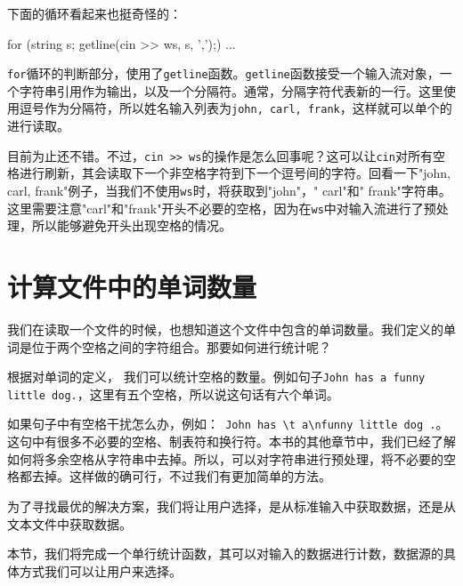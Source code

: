 下面的循环看起来也挺奇怪的：

\begin{codebox}[cpp]
for (string s; getline(cin >> ws, s, ',');) { ... }
\end{codebox}

\texttt{for}循环的判断部分，使用了\texttt{getline}函数。\texttt{getline}函数接受一个输入流对象，一个字符串引用作为输出，以及一个分隔符。通常，分隔字符代表新的一行。这里使用逗号作为分隔符，所以姓名输入列表为\texttt{john, carl, frank}，这样就可以单个的进行读取。

目前为止还不错。不过，\texttt{cin >> ws}的操作是怎么回事呢？这可以让\texttt{cin}对所有空格进行刷新，其会读取下一个非空格字符到下一个逗号间的字符。回看一下"john, carl, frank"例子，当我们不使用\texttt{ws}时，将获取到"john"，" carl"和" frank"字符串。这里需要注意"carl"和"frank"开头不必要的空格，因为在\texttt{ws}中对输入流进行了预处理，所以能够避免开头出现空格的情况。


\section{计算文件中的单词数量}

我们在读取一个文件的时候，也想知道这个文件中包含的单词数量。我们定义的单词是位于两个空格之间的字符组合。那要如何进行统计呢？

根据对单词的定义， 我们可以统计空格的数量。例如句子\texttt{John has a funny little dog.}，这里有五个空格，所以说这句话有六个单词。

如果句子中有空格干扰怎么办，例如：\texttt{ John has \textbackslash{}t a\textbackslash{}nfunny little dog .}。这句中有很多不必要的空格、制表符和换行符。本书的其他章节中，我们已经了解如何将多余空格从字符串中去掉。所以，可以对字符串进行预处理，将不必要的空格都去掉。这样做的确可行，不过我们有更加简单的方法。

为了寻找最优的解决方案，我们将让用户选择，是从标准输入中获取数据，还是从文本文件中获取数据。


本节，我们将完成一个单行统计函数，其可以对输入的数据进行计数，数据源的具体方式我们可以让用户来选择。

